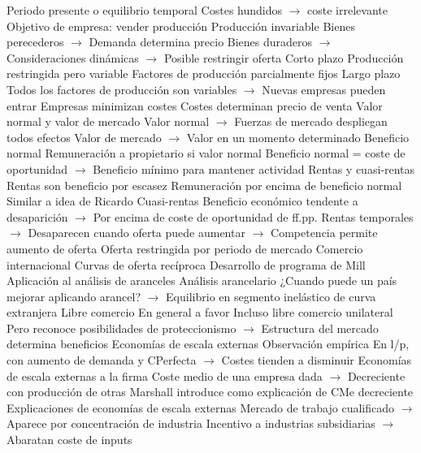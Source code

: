 \documentclass{nuevotema}
\begin{document}
\begin{esquemal}
				\4 Periodo presente o equilibrio temporal
				\4[] Costes hundidos $\to$ coste irrelevante
				\4[] Objetivo de empresa: vender producción
				\4[] Producción invariable
				\4[] Bienes perecederos
				\4[] $\to$ Demanda determina precio
				\4[] Bienes duraderos
				\4[] $\to$ Consideraciones dinámicas
				\4[] $\to$ Posible restringir oferta
				\4 Corto plazo
				\4[] Producción restringida pero variable
				\4[] Factores de producción parcialmente fijos
				\4 Largo plazo
				\4[] Todos los factores de producción son variables
				\4[] $\to$ Nuevas empresas pueden entrar
				\4[] Empresas minimizan costes
				\4[] Costes determinan precio de venta
				\4 Valor normal y valor de mercado
				\4[] Valor normal
				\4[] $\to$ Fuerzas de mercado despliegan todos efectos
				\4[] Valor de mercado
				\4[] $\to$ Valor en un momento determinado
				\4 Beneficio normal
				\4[] Remuneración a propietario si valor normal
				\4[] Beneficio normal =  coste de oportunidad
				\4[] $\to$ Beneficio mínimo para mantener actividad
			\3 Rentas y cuasi-rentas
				\4 Rentas son beneficio por escasez
				\4[] Remuneración por encima de beneficio normal
				\4[] Similar a idea de Ricardo
				\4 Cuasi-rentas
				\4[] Beneficio económico tendente a desaparición
				\4[] $\to$ Por encima de coste de oportunidad de ff.pp.
				\4[] Rentas temporales
				\4[] $\to$ Desaparecen cuando oferta puede aumentar
				\4[] $\to$ Competencia permite aumento de oferta
				\4[] Oferta restringida por periodo de mercado
			\3 Comercio internacional
				\4 Curvas de oferta recíproca
				\4[] Desarrollo de programa de Mill
				\4[] Aplicación al análisis de aranceles
				\4 Análisis arancelario
				\4[] ¿Cuando puede un país mejorar aplicando arancel?
				\4[] $\to$ Equilibrio en segmento inelástico de curva extranjera
				\4 Libre comercio
				\4[] En general a favor
				\4[] Incluso libre comercio unilateral
				\4[] Pero reconoce posibilidades de proteccionismo
				\4[] $\to$ Estructura del mercado determina beneficios
			\3 Economías de escala externas
				\4 Observación empírica
				\4[] En l/p, con aumento de demanda y CPerfecta
				\4[] $\to$ Costes tienden a disminuir
				\4 Economías de escala externas a la firma
				\4[] Coste medio de una empresa dada
				\4[] $\to$ Decreciente con producción de otras
				\4 Marshall introduce como explicación de CMe decreciente
				\4 Explicaciones de economías de escala externas
				\4[] Mercado de trabajo cualificado
				\4[] $\to$ Aparece por concentración de industria
				\4[] Incentivo a industrias subsidiarias
				\4[] $\to$ Abaratan coste de inputs

\end{esquemal}
\end{document}
